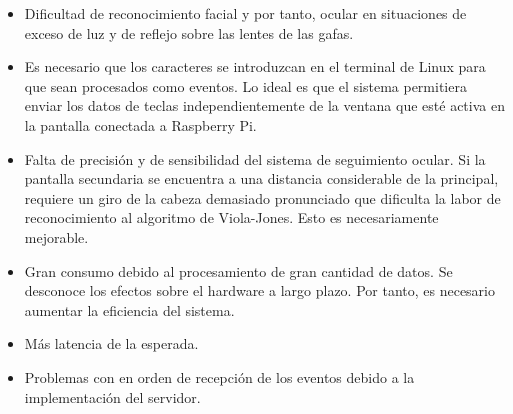 \begin{itemize}
    \item Dificultad de reconocimiento facial y por tanto, ocular en situaciones de exceso de luz y de reflejo sobre las lentes de las gafas.
    \item Es necesario que los caracteres se introduzcan en el terminal de Linux para que sean procesados como eventos. Lo ideal es que el sistema permitiera enviar los datos de teclas independientemente de la ventana que esté activa en la pantalla conectada a Raspberry Pi.
    \item Falta de precisión y de sensibilidad del sistema de seguimiento ocular. Si la pantalla secundaria se encuentra a una distancia considerable de la principal, requiere un giro de la cabeza demasiado pronunciado que dificulta la labor de reconocimiento al algoritmo de Viola-Jones. Esto es necesariamente mejorable.
    \item Gran consumo debido al procesamiento de gran cantidad de datos. Se desconoce los efectos sobre el hardware a largo plazo. Por tanto, es necesario aumentar la eficiencia del sistema.
    \item Más latencia de la esperada.
    \item Problemas con en orden de recepción de los eventos debido a la implementación del servidor.
\end{itemize}
















\newpage

